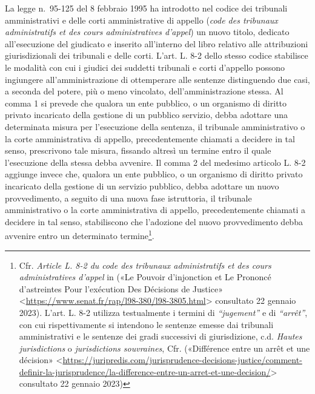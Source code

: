 \documentclass[12pt,it,a4paper,]{report}
\begin{document}
La legge n.~95-125 del 8 febbraio 1995 ha introdotto nel codice dei
tribunali amministrativi e delle corti amministrative di appello
(\emph{code des tribunaux administratifs et des cours administratives
d'appel}) un nuovo titolo, dedicato all'esecuzione del giudicato e
inserito all'interno del libro relativo alle attribuzioni
giurisdizionali dei tribunali e delle corti. L'art. L. 8-2 dello stesso
codice stabilisce le modalità con cui i giudici dei suddetti tribunali e
corti d'appello possono ingiungere all'amministrazione di ottemperare
alle sentenze distinguendo due casi, a seconda del potere, più o meno
vincolato, dell'amministrazione stessa. Al comma 1 si prevede che
qualora un ente pubblico, o un organismo di diritto privato incaricato
della gestione di un pubblico servizio, debba adottare una determinata
misura per l'esecuzione della sentenza, il tribunale amministrativo o la
corte amministrativa di appello, precedentemente chiamati a decidere in
tal senso, prescrivono tale misura, fissando altresì un termine entro il
quale l'esecuzione della stessa debba avvenire. Il comma 2 del medesimo
articolo L. 8-2 aggiunge invece che, qualora un ente pubblico, o un
organismo di diritto privato incaricato della gestione di un servizio
pubblico, debba adottare un nuovo provvedimento, a seguito di una nuova
fase istruttoria, il tribunale amministrativo o la corte amministrativa
di appello, precedentemente chiamati a decidere in tal senso,
stabiliscono che l'adozione del nuovo provvedimento debba avvenire entro
un determinato termine\footnote{Cfr. \emph{Article L. 8-2 du code des
  tribunaux administratifs et des cours administratives d'appel} in
  ({«Le Pouvoir d'injonction et Le Prononcé d'astreintes Pour
  l'exécution Des Décisions de Justice»}
  \textless{}\url{https://www.senat.fr/rap/l98-380/l98-3805.html}\textgreater{}
  consultato 22 gennaio 2023). L'art. L. 8-2 utilizza testualmente i
  termini di \emph{``jugement''} e di \emph{``arrêt''}, con cui
  rispettivamente si intendono le sentenze emesse dai tribunali
  amministrativi e le sentenze dei gradi successivi di giurisdizione,
  c.d. \emph{Hautes jurisdictions} o \emph{jurisdictions souvraines},
  Cfr. ({«Différence entre un arrêt et une décision»}
  \textless{}\url{https://juripredis.com/jurisprudence-decisions-justice/comment-definir-la-jurisprudence/la-difference-entre-un-arret-et-une-decision/}\textgreater{}
  consultato 22 gennaio 2023)}.
\end{document}
